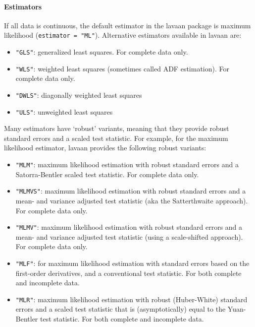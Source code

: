 \hypertarget{estimators}{%
\paragraph{Estimators}\label{estimators}}

If all data is continuous, the default estimator in the lavaan package
is maximum likelihood (\texttt{estimator\ =\ "ML"}). Alternative
estimators available in lavaan are:

\begin{itemize}
\tightlist
\item
  \texttt{"GLS"}: generalized least squares. For complete data only.
\item
  \texttt{"WLS"}: weighted least squares (sometimes called ADF
  estimation). For complete data only.
\item
  \texttt{"DWLS"}: diagonally weighted least squares
\item
  \texttt{"ULS"}: unweighted least squares
\end{itemize}

Many estimators have `robust' variants, meaning that they provide robust
standard errors and a scaled test statistic. For example, for the
maximum likelihood estimator, lavaan provides the following robust
variants:

\begin{itemize}
\tightlist
\item
  \texttt{"MLM"}: maximum likelihood estimation with robust standard
  errors and a Satorra-Bentler scaled test statistic. For complete data
  only.
\item
  \texttt{"MLMVS"}: maximum likelihood estimation with robust standard
  errors and a mean- and variance adjusted test statistic (aka the
  Satterthwaite approach). For complete data only.
\item
  \texttt{"MLMV"}: maximum likelihood estimation with robust standard
  errors and a mean- and variance adjusted test statistic (using a
  scale-shifted approach). For complete data only.
\item
  \texttt{"MLF"}: for maximum likelihood estimation with standard errors
  based on the first-order derivatives, and a conventional test
  statistic. For both complete and incomplete data.
\item
  \texttt{"MLR"}: maximum likelihood estimation with robust
  (Huber-White) standard errors and a scaled test statistic that is
  (asymptotically) equal to the Yuan-Bentler test statistic. For both
  complete and incomplete data.
\end{itemize}


